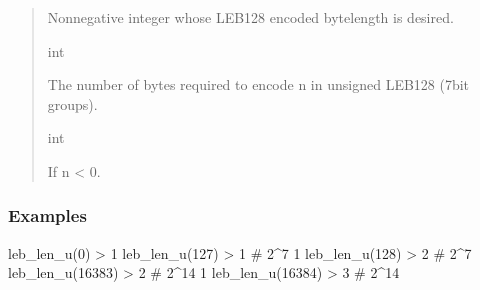 \documentclass[letterpaper,10pt,english]{sphinxmanual}
\begin{document}
\begin{fulllineitems}
\begin{quote}
\begin{description}
\sphinxAtStartPar
Non\sphinxhyphen{}negative integer whose LEB128 encoded byte\sphinxhyphen{}length is desired.

\sphinxAtStartPar
int

\sphinxAtStartPar
The number of bytes required to encode n in unsigned LEB128 (7\sphinxhyphen{}bit groups).

\sphinxAtStartPar
int

\sphinxAtStartPar
If n \textless{} 0.

\end{description}\end{quote}
\subsubsection*{Examples}

\sphinxAtStartPar
leb\_len\_u(0)     \sphinxhyphen{}\textgreater{} 1
leb\_len\_u(127)   \sphinxhyphen{}\textgreater{} 1   \# 2\textasciicircum{}7 \sphinxhyphen{} 1
leb\_len\_u(128)   \sphinxhyphen{}\textgreater{} 2   \# 2\textasciicircum{}7
leb\_len\_u(16383) \sphinxhyphen{}\textgreater{} 2   \# 2\textasciicircum{}14 \sphinxhyphen{} 1
leb\_len\_u(16384) \sphinxhyphen{}\textgreater{} 3   \# 2\textasciicircum{}14

\end{fulllineitems}

\end{document}
